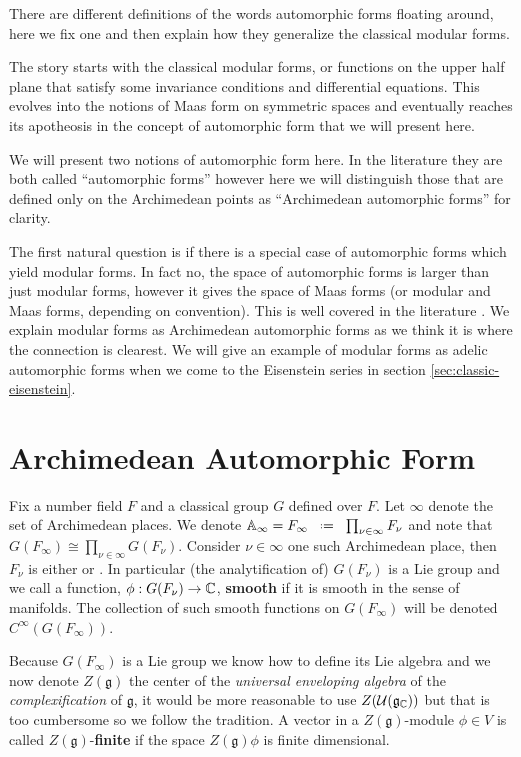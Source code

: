 There are different definitions of the words automorphic forms floating around, here we fix one and then explain how they generalize the classical modular forms.

The story starts with the classical modular forms, or functions on the upper half plane that satisfy some invariance conditions and differential equations. This evolves into the notions of Maas form on symmetric spaces and eventually reaches its apotheosis in the concept of automorphic form that we will present here. 

We will present two notions of automorphic form here. In the literature they are both called ``automorphic forms'' however here we will distinguish those that are defined only on the Archimedean points as ``Archimedean automorphic forms'' for clarity.

The first natural question is if there is a special case of automorphic forms which yield modular forms. In fact no, the space of automorphic forms is larger than just modular forms, however it gives the space of Maas forms (or modular and Maas forms, depending on convention). This is well covered in the literature \cite{emertonCLASSICALMODULARFORMS}\cite[3.2]{bumpAutomorphicFormsRepresentations1997}\cite{booherVIEWINGMODULARFORMS}\cite{garrettTransitionEisensteinSeries2016}. We explain modular forms as Archimedean automorphic forms as we think it is where the connection is clearest. We will give an example of modular forms as adelic automorphic forms when we come to the Eisenstein series in section \ref{sec:classic-eisenstein}.




\section{Archimedean Automorphic Form}
Fix a number field \(F\) and a classical group \(G\) defined over \(F\). Let \(\infty\) denote the set of Archimedean places. We denote \(\A_\infty = F_\infty \defeq \prod_{\nu\in\infty} F_\nu\) and note that \(G(F_\infty) \cong \prod_{\nu\in\infty}G(F_\nu)\). Consider \(\nu\in \infty\) one such Archimedean place, then \(F_\nu\) is either \R or \C. In particular (the analytification of) \(G(F_\nu)\) is a Lie group and we call a function, \(\phi: G(F_\nu) \to \C\), \textbf{smooth}  if it is smooth in the sense of manifolds. The collection of such smooth functions on \(G(F_\infty)\) will be denoted \(C^\infty(G(F_\infty))\).

    Because \(G(F_\infty)\) is a Lie group we know how to define its Lie algebra and we now denote \(Z(\mathfrak{g})\) the center of the \textit{universal enveloping algebra} of the \textit{complexification} of \(\mathfrak{g}\), it would be more reasonable to use \(Z(\mathcal{U}(\mathfrak{g}_{\C}))\) but that is too cumbersome so we follow the tradition. 
    A vector in a \(Z(\mathfrak{g})\)-module \(\phi\in V\) is called \(Z(\mathfrak{g})\)-\textbf{finite} if the space \(Z(\mathfrak{g})\phi\) is finite dimensional. 

